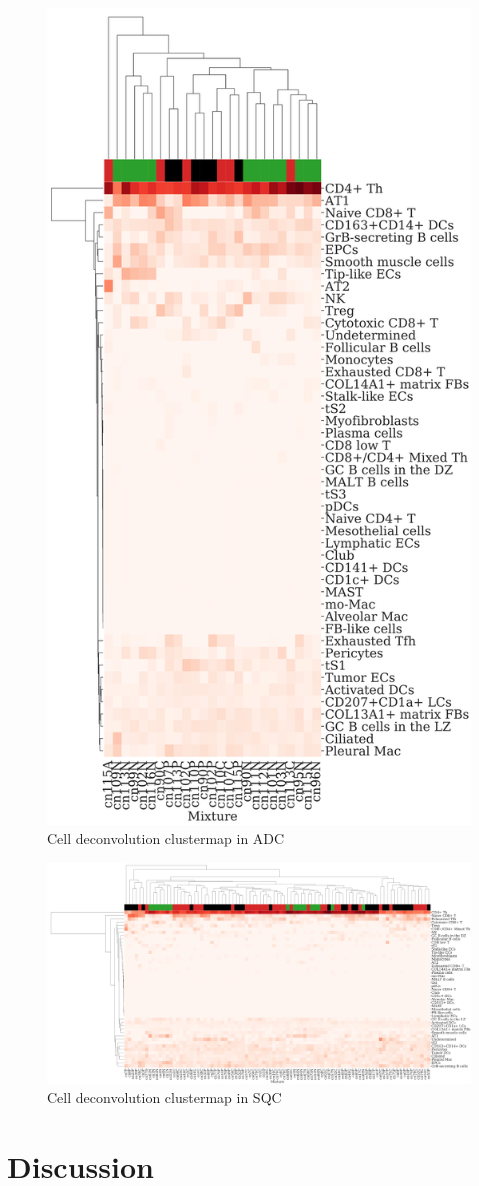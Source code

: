 \documentclass[a4paper]{article}
\begin{document}
            \begin{figure}[htbp]
                \centering
                \includegraphics[width=0.4 \linewidth]{figures/CIBERSORTx/clustermap/ADC.Bowtie2.cluster.pdf}
                \caption{Cell deconvolution clustermap in ADC}
                \label{fig:Deconvolution-cluster-ADC}
            \end{figure}

            \begin{figure}[htbp]
                \centering
                \includegraphics[width=\linewidth]{figures/CIBERSORTx/clustermap/SQC.Bowtie2.cluster.pdf}
                \caption{Cell deconvolution clustermap in SQC}
                \label{fig:Deconvolution-cluster-SQC}
            \end{figure}

    \section{Discussion}

    
    
\end{document}
